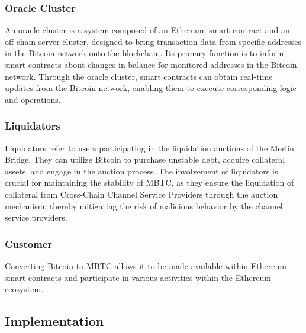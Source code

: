 \documentclass{article}
\begin{document}
\subsubsection{Oracle Cluster}
An oracle cluster is a system composed of an Ethereum smart contract and an off-chain server cluster, designed to bring transaction data from specific addresses in the Bitcoin network onto the blockchain. Its primary function is to inform smart contracts about changes in balance for monitored addresses in the Bitcoin network. Through the oracle cluster, smart contracts can obtain real-time updates from the Bitcoin network, enabling them to execute corresponding logic and operations.
\subsubsection{Liquidators}
Liquidators refer to users participating in the liquidation auctions of the Merlin Bridge. They can utilize Bitcoin to purchase unstable debt, acquire collateral assets, and engage in the auction process. The involvement of liquidators is crucial for maintaining the stability of MBTC, as they ensure the liquidation of collateral from Cross-Chain Channel Service Providers through the auction mechanism, thereby mitigating the risk of malicious behavior by the channel service providers.
\subsubsection{Customer}
Converting Bitcoin to MBTC allows it to be made available within Ethereum smart contracts and participate in various activities within the Ethereum ecosystem.
\subsection{Implementation}
\end{document}
